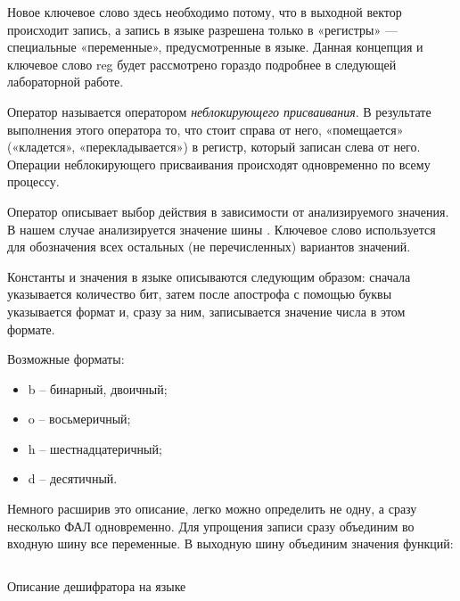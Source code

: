\par{Новое ключевое слово  здесь необходимо потому, что в выходной вектор происходит запись, а запись в языке  разрешена только в «регистры» — специальные «переменные», предусмотренные в языке. Данная концепция и ключевое слово reg будет рассмотрено гораздо подробнее в следующей лабораторной работе.}

\par{Оператор \kword{<=} называется оператором \emph{неблокирующего присваивания}. В результате выполнения этого оператора то, что стоит справа от него, «помещается» («кладется», «перекладывается») в регистр, который записан слева от него. Операции неблокирующего присваивания происходят одновременно по всему процессу.}

\par{Оператор  описывает выбор действия в зависимости от анализируемого значения. В нашем случае анализируется значение шины . Ключевое слово  используется для обозначения всех остальных (не перечисленных) вариантов значений.}

\par{Константы и значения в языке  описываются следующим образом: сначала указывается количество бит, затем после апострофа с помощью буквы указывается формат и, сразу за ним, записывается значение числа в этом формате.}

\par{Возможные форматы:
  \begin{itemize}%
    \item b – бинарный, двоичный;
    \item o – восьмеричный;
    \item h – шестнадцатеричный;
    \item d – десятичный.
  \end{itemize}}

\par{Немного расширив это описание, легко можно определить не одну, а сразу несколько ФАЛ одновременно. Для упрощения записи сразу объединим во входную шину все переменные. В выходную шину объединим значения функций:}


\begin{listing}[H]
	\inputminted{SystemVerilog}{code_examples/lab_1/decoder.sv}
	\caption{Описание дешифратора на языке }
\end{listing}


